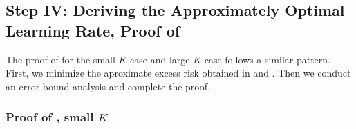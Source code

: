\subsection{Step IV: Deriving the Approximately Optimal Learning Rate, Proof of }\label{proof:convex-opt-lr}

The proof of  for the small-$K$ case and large-$K$ case follows a similar pattern. First, we minimize the aproximate excess risk obtained in  and . Then we conduct an error bound analysis and complete the proof.
\subsubsection{Proof of , small $K$}

